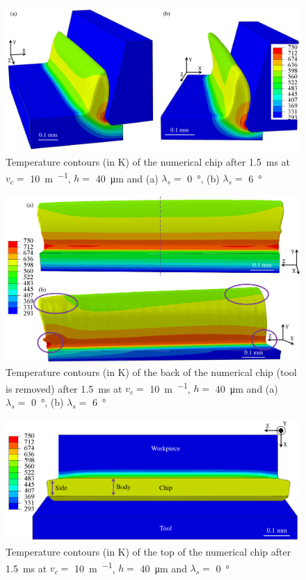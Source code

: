 \documentclass[preprint,12pt,times]{elsarticle}
\begin{document}
\begin{figure}[!h]
\centering
\includegraphics[width = 140 mm]{Figures/ChipsNum}
\caption{Temperature contours (in \unit{\K}) of the numerical chip after \qty{1.5}{\ms} at $v_c =$ \qty{10}{\m\per\min}, $h =$ \qty{40}{\um} and (a) $\lambda_s =$ \qty{0}{\degree}, (b) $\lambda_s =$ \qty{6}{\degree}}
\label{fig:ChipsNum}
\end{figure}

\begin{figure}[!h]
\centering
\includegraphics[width = 140 mm]{Figures/ChipsNumBack}
\caption{Temperature contours (in \unit{\K}) of the back of the numerical chip (tool is removed) after \qty{1.5}{\ms} at $v_c =$ \qty{10}{\m\per\min}, $h =$ \qty{40}{\um} and (a) $\lambda_s =$ \qty{0}{\degree}, (b) $\lambda_s =$ \qty{6}{\degree}}
\label{fig:ChipsNumBack}
\end{figure}

\begin{figure}[!h]
\centering
\includegraphics[width = 140 mm]{Figures/ChipNumTop}
\caption{Temperature contours (in \unit{\K}) of the top of the numerical chip after \qty{1.5}{\ms} at $v_c =$ \qty{10}{\m\per\min}, $h =$ \qty{40}{\um} and $\lambda_s =$ \qty{0}{\degree}}
\label{fig:ChipNumTop}
\end{figure}
\end{document}

